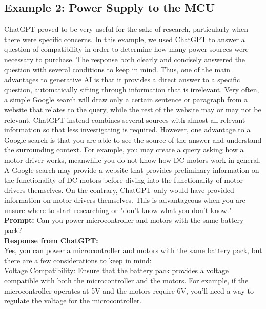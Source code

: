 
\subsection{Example 2: Power Supply to the MCU}
\noindent ChatGPT proved to be very useful for the sake of research, particularly when there were specific concerns. In this example, we used ChatGPT to answer a question of compatibility in order to determine how many power sources were necessary to purchase. The response both clearly and concisely answered the question with several conditions to keep in mind. Thus, one of the main advantages to generative AI is that it provides a direct answer to a specific question, automatically sifting through information that is irrelevant. Very often, a simple Google search will draw only a certain sentence or paragraph from a website that relates to the query, while the rest of the website may or may not be relevant. ChatGPT instead combines several sources with almost all relevant information so that less investigating is required. However, one advantage to a Google search is that you are able to see the source of the answer and understand the surrounding context. For example, you may create a query asking how a motor driver works, meanwhile you do not know how DC motors work in general. A Google search may provide a website that provides preliminary information on the functionality of DC motors before diving into the functionality of motor drivers themselves. On the contrary, ChatGPT only would have provided information on motor drivers themselves. This is advantageous when you are unsure where to start researching or "don't know what you don't know."\\

\noindent \textbf{Prompt:} Can you power microcontroller and motors with the same battery pack?\\

\noindent\textbf{ Response from ChatGPT:}\\
\noindent Yes, you can power a microcontroller and motors with the same battery pack, but there are a few considerations to keep in mind:\\

\noindent Voltage Compatibility: Ensure that the battery pack provides a voltage compatible with both the microcontroller and the motors. For example, if the microcontroller operates at 5V and the motors require 6V, you'll need a way to regulate the voltage for the microcontroller.\\


